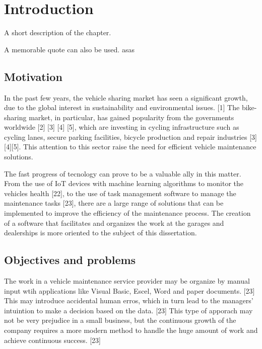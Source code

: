 \chapter{Introduction}%
\label{chapter:introduction}

\begin{introduction}
A short description of the chapter.

A memorable quote can also be used. asas
\end{introduction} 


\section{Motivation}

In the past few years, the vehicle sharing market has seen a significant growth, due to the global interest in sustainability and environmental issues. [1]
The bike-sharing market, in particular, has gained popularity from the governments worldwide [2] [3] [4] [5], which are investing in cycling infrastructure such as cycling lanes, secure parking facilities, bicycle production and repair industries [3][4][5].
This attention to this sector raise the need for efficient vehicle maintenance solutions.


    
The fast progress of tecnology can prove to be a valuable ally in this matter. 
From the use of IoT devices with machine learning algorithms to monitor the vehicles health [22], 
to the use of task management software to manage the maintenance tasks [23], 
there are a large range of solutions that can be implemented to improve the efficiency of the maintenance process.
The creation of a software that facilitates and organizes the work at the garages and dealerships is more oriented to the subject of this dissertation. 

\section{Objectives and problems}

The work in a vehicle maintenance service provider may be organize by manual input wtih applications like Visual Basic, Escel, Word and paper documents. [23] 
This may introduce accidental human erros, which in turn lead to the managers' intuintion to make a decision based on the data. [23]
This type of apporach may not be very prejudice in a small business, but the continuous growth of the company requires a more modern method to handle the huge amount of work and achieve continuous success. [23]

